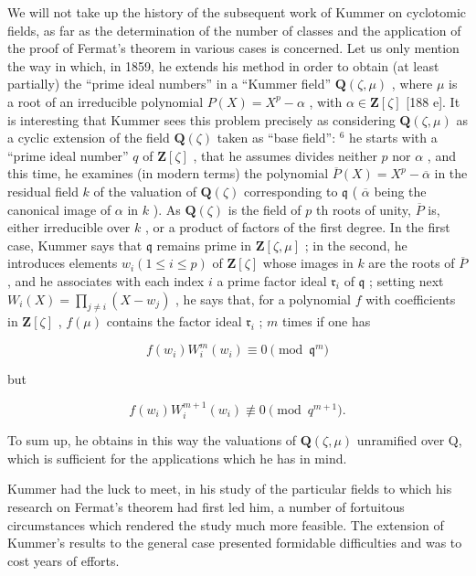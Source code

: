 We will not take up the history of the subsequent work of Kummer on cyclotomic fields, as far as the determination of the number of classes and the application of the proof of Fermat's theorem in various cases is concerned. Let us only mention the way in which, in 1859, he extends his method in order to obtain (at least partially) the ``prime ideal numbers'' in a ``Kummer field'' \(\mathbf{Q}(\zeta, \mu)\) , where \(\mu\) is a root of an irreducible polynomial \(P(X) = X^p - \alpha\) , with \(\alpha \in \mathbf{Z}[\zeta]\) {[}188 e{]}. It is interesting that Kummer sees this problem precisely as considering \(\mathbf{Q}(\zeta, \mu)\) as a cyclic extension of the field \(\mathbf{Q}(\zeta)\) taken as ``base field'': \(^6\) he starts with a ``prime ideal number'' \(q\) of \(\mathbf{Z}[\zeta]\) , that he assumes divides neither \(p\) nor \(\alpha\) , and this time, he examines (in modern terms) the polynomial \(\overline{P}(X) = X^p - \overline{\alpha}\) in the residual field \(k\) of the valuation of \(\mathbf{Q}(\zeta)\) corresponding to \(\mathfrak{q}\) ( \(\overline{\alpha}\) being the canonical image of \(\alpha\) in \(k\) ). As \(\mathbf{Q}(\zeta)\) is the field of \(p\) th roots of unity, \(\overline{P}\) is, either irreducible over \(k\) , or a product of factors of the first degree. In the first case, Kummer says that \(\mathfrak{q}\) remains prime in \(\mathbf{Z}[\zeta, \mu]\) ; in the second, he introduces elements \(w_i(1 \leq i \leq p)\) of \(\mathbf{Z}[\zeta]\) whose images in \(k\) are the roots of \(\overline{P}\) , and he associates with each index \(i\) a prime factor ideal \(\mathfrak{r}_i\) of \(\mathfrak{q}\) ; setting next \(W_i(X) = \prod_{j \neq i}(X - w_j)\) , he says that, for a polynomial \(f\) with coefficients in \(\mathbf{Z}[\zeta]\) , \(f(\mu)\) contains the factor ideal \(\mathfrak{r}_i\) ; \(m\) times if one has

\[
f (w _ {i}) W _ {i} ^ {m} (w _ {i}) \equiv 0 \pmod {\mathfrak {q} ^ {m}}
\]

but

\[
f (w _ {i}) W _ {i} ^ {m + 1} (w _ {i}) \not \equiv 0 \pmod {q ^ {m + 1}}.
\]

To sum up, he obtains in this way the valuations of \(\mathbf{Q}(\zeta,\mu)\) unramified over Q, which is sufficient for the applications which he has in mind.

Kummer had the luck to meet, in his study of the particular fields to which his research on Fermat's theorem had first led him, a number of fortuitous circumstances which rendered the study much more feasible. The extension of Kummer's results to the general case presented formidable difficulties and was to cost years of efforts.


